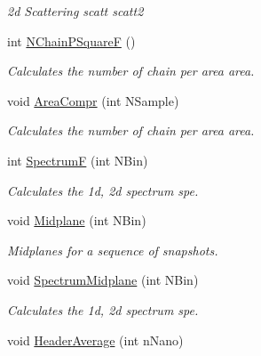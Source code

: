 \begin{DoxyCompactItemize}
\begin{DoxyCompactList}\small\item\em 2d Scattering  scatt scatt2 \end{DoxyCompactList}\item 
int \hyperlink{classElPoly_afe2c794cc4f62f2e547526f63e82acfe}{N\+Chain\+P\+SquareF} ()\hypertarget{classElPoly_afe2c794cc4f62f2e547526f63e82acfe}{}\label{classElPoly_afe2c794cc4f62f2e547526f63e82acfe}

\begin{DoxyCompactList}\small\item\em Calculates the number of chain per area  area. \end{DoxyCompactList}\item 
void \hyperlink{classElPoly_afbe805e551084aebeee2c673c9b3937a}{Area\+Compr} (int N\+Sample)
\begin{DoxyCompactList}\small\item\em Calculates the number of chain per area  area. \end{DoxyCompactList}\item 
int \hyperlink{classElPoly_ada953db0b772595339ef925b5dbd8c62}{SpectrumF} (int N\+Bin)\hypertarget{classElPoly_ada953db0b772595339ef925b5dbd8c62}{}\label{classElPoly_ada953db0b772595339ef925b5dbd8c62}

\begin{DoxyCompactList}\small\item\em Calculates the 1d, 2d spectrum  spe. \end{DoxyCompactList}\item 
void \hyperlink{classElPoly_a16156b6e530ecc6df93b6ffd3c229f1b}{Midplane} (int N\+Bin)\hypertarget{classElPoly_a16156b6e530ecc6df93b6ffd3c229f1b}{}\label{classElPoly_a16156b6e530ecc6df93b6ffd3c229f1b}

\begin{DoxyCompactList}\small\item\em Midplanes for a sequence of snapshots. \end{DoxyCompactList}\item 
void \hyperlink{classElPoly_a669491e5e5c66f665694c9d8908d3109}{Spectrum\+Midplane} (int N\+Bin)\hypertarget{classElPoly_a669491e5e5c66f665694c9d8908d3109}{}\label{classElPoly_a669491e5e5c66f665694c9d8908d3109}

\begin{DoxyCompactList}\small\item\em Calculates the 1d, 2d spectrum  spe. \end{DoxyCompactList}\item 
void \hyperlink{classElPoly_a2eab2da94941b822d51d4e21bfe64aef}{Header\+Average} (int n\+Nano)\hypertarget{classElPoly_a2eab2da94941b822d51d4e21bfe64aef}{}\label{classElPoly_a2eab2da94941b822d51d4e21bfe64aef}


\end{DoxyCompactItemize}
